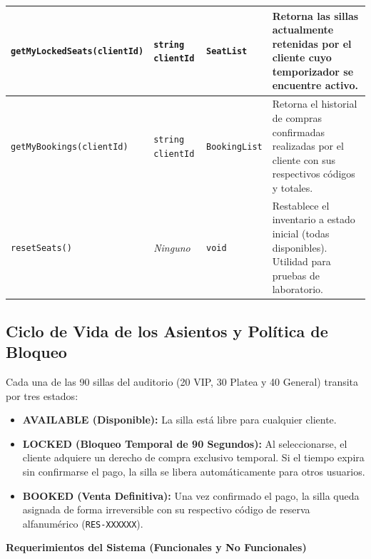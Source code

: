 \documentclass[10pt,letterpaper]{article}
\newcommand{\sectionBadge}[1]{%
  \refstepcounter{section}%
  \vspace{0.24cm}%
  \noindent%
  \colorbox{icesiBlue}{\color{white}\rule[-0.08cm]{0pt}{0.42cm}\hspace{0.16cm}\textbf{\normalsize \thesection}\hspace{0.16cm}}%
  \hspace{0.18cm}%
  {\fontsize{9.5}{12}\selectfont\textbf{\color{icesiDark}#1}}\\[-0.10cm]%
  \noindent{\color{icesiDark}\rule{\textwidth}{0.8pt}}\vspace{0.10cm}%
}
\begin{document}
\begin{center}
\begin{tabularx}{\textwidth}{@{}|l|p{3.2cm}|l|X|@{}}
\hline
\texttt{getMyLockedSeats(clientId)} & \texttt{string clientId} & \texttt{SeatList} & Retorna las sillas actualmente retenidas por el cliente cuyo temporizador se encuentre activo. \\
\hline
\texttt{getMyBookings(clientId)} & \texttt{string clientId} & \texttt{BookingList} & Retorna el historial de compras confirmadas realizadas por el cliente con sus respectivos códigos y totales. \\
\hline
\texttt{resetSeats()} & \textit{Ninguno} & \texttt{void} & Restablece el inventario a estado inicial (todas disponibles). Utilidad para pruebas de laboratorio. \\
\hline
\end{tabularx}
\end{center}

\subsection{Ciclo de Vida de los Asientos y Política de Bloqueo}
Cada una de las 90 sillas del auditorio (20 VIP, 30 Platea y 40 General) transita por tres estados:
\begin{itemize}[leftmargin=*]
  \item \textbf{AVAILABLE (Disponible):} La silla está libre para cualquier cliente.
  \item \textbf{LOCKED (Bloqueo Temporal de 90 Segundos):} Al seleccionarse, el cliente adquiere un derecho de compra exclusivo temporal. Si el tiempo expira sin confirmarse el pago, la silla se libera automáticamente para otros usuarios.
  \item \textbf{BOOKED (Venta Definitiva):} Una vez confirmado el pago, la silla queda asignada de forma irreversible con su respectivo código de reserva alfanumérico (\texttt{RES-XXXXXX}).
\end{itemize}

\vspace{4pt}

\sectionBadge{Requerimientos del Sistema (Funcionales y No Funcionales)}
\end{document}
